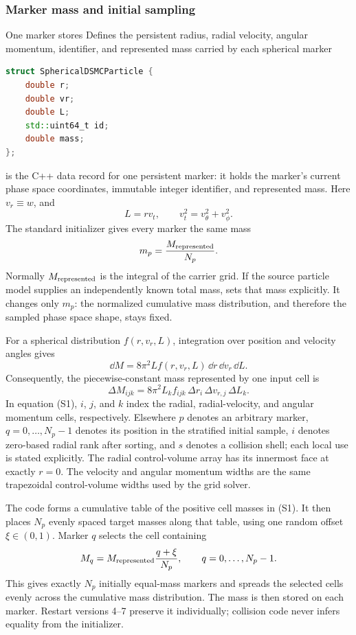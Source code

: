 \subsubsection{Marker mass and initial sampling}

One marker stores
{}
{Defines the persistent radius, radial velocity, angular momentum, identifier,
 and represented mass carried by each spherical marker}
\begin{lstlisting}[language=C++,basicstyle=\ttfamily\scriptsize]
struct SphericalDSMCParticle {
    double r;
    double vr;
    double L;
    std::uint64_t id;
    double mass;
};
\end{lstlisting}
 is the C++ data record for one persistent
marker: it holds the marker's current phase space coordinates, immutable
integer identifier, and represented mass.  Here \(v_r\equiv w\), and
\[
 L=r v_t,\qquad v_t^2=v_\theta^2+v_\phi^2.
\]
The standard initializer gives every marker the same mass
\[
 m_p=\frac{M_{\rm represented}}{N_p}.
\]
Normally \(M_{\rm represented}\) is the integral of the carrier grid.  If the
source particle model supplies an independently known total mass,
 sets that mass explicitly.  It changes only \(m_p\):
the normalized cumulative mass distribution, and therefore the sampled
phase space shape, stays fixed.

For a spherical distribution \(f(r,v_r,L)\), integration over position and
velocity angles gives
\[
 \dd M=8\pi^2 Lf(r,v_r,L)\,\dd r\,\dd v_r\,\dd L.
\]
Consequently, the piecewise-constant mass represented by one input cell is
\[
 \Delta M_{ijk}
 =8\pi^2L_k f_{ijk}\,
   \Delta r_i\,\Delta v_{r,j}\,\Delta L_k.                 \tag{S1}
\]
In equation (S1), \(i\), \(j\), and \(k\) index the radial,
radial-velocity, and angular momentum cells, respectively.  Elsewhere \(p\)
denotes an arbitrary marker, \(q=0,\ldots,N_p-1\) denotes its position in the
stratified initial sample, \(i\) denotes zero-based radial rank after sorting,
and \(s\) denotes a collision shell; each local use is stated explicitly.
The radial control-volume array has its innermost face at exactly \(r=0\).
The velocity and angular momentum widths are the same trapezoidal
control-volume widths used by the grid solver.

The code forms a cumulative table of the positive cell masses in (S1).
It then places \(N_p\) evenly spaced target masses along that table, using one
random offset \(\xi\in(0,1)\).  Marker \(q\) selects the cell containing
\[
 M_q=M_{\rm represented}\frac{q+\xi}{N_p},
 \qquad q=0,\ldots,N_p-1.
\]
This gives exactly \(N_p\) initially equal-mass markers and spreads the
selected cells evenly across the cumulative mass distribution.  The mass is
then stored on each marker.  Restart versions 4--7 preserve it individually;
collision code never infers equality from the initializer.

